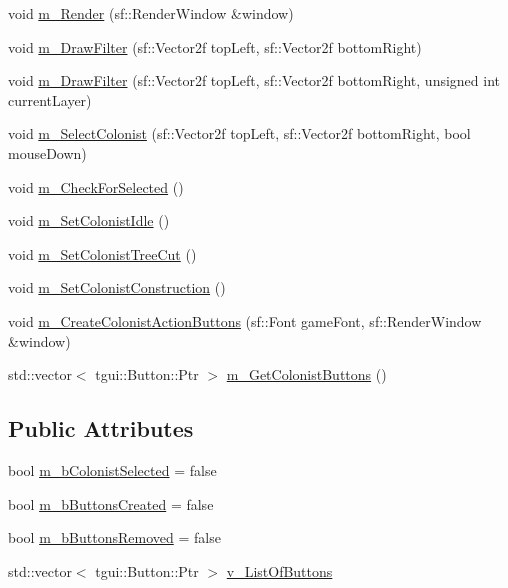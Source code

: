 \begin{DoxyCompactItemize}
void \mbox{\hyperlink{class_colonist_manager_a03bf090e3d6dc4f731daef7f91ea1f11}{m\+\_\+\+Render}} (sf\+::\+Render\+Window \&window)
\item 
void \mbox{\hyperlink{class_colonist_manager_ae7960d47970d69bc0f2f3de15321fa90}{m\+\_\+\+Draw\+Filter}} (sf\+::\+Vector2f top\+Left, sf\+::\+Vector2f bottom\+Right)
\item 
void \mbox{\hyperlink{class_colonist_manager_a1cfc018393b4410129875a3fe0be4fd4}{m\+\_\+\+Draw\+Filter}} (sf\+::\+Vector2f top\+Left, sf\+::\+Vector2f bottom\+Right, unsigned int current\+Layer)
\item 
void \mbox{\hyperlink{class_colonist_manager_adb2f8be8fad5170fb41385c6a62a0ba5}{m\+\_\+\+Select\+Colonist}} (sf\+::\+Vector2f top\+Left, sf\+::\+Vector2f bottom\+Right, bool mouse\+Down)
\item 
void \mbox{\hyperlink{class_colonist_manager_ac21585da4afdb19b5b5474c630960189}{m\+\_\+\+Check\+For\+Selected}} ()
\item 
void \mbox{\hyperlink{class_colonist_manager_a8a9cb88c826c72026575e5c2d9bec88d}{m\+\_\+\+Set\+Colonist\+Idle}} ()
\item 
void \mbox{\hyperlink{class_colonist_manager_ad494974bebe1f0af43b2721f289f7772}{m\+\_\+\+Set\+Colonist\+Tree\+Cut}} ()
\item 
void \mbox{\hyperlink{class_colonist_manager_a64d61e7131db646318691539f0460eed}{m\+\_\+\+Set\+Colonist\+Construction}} ()
\item 
void \mbox{\hyperlink{class_colonist_manager_ab3101b874a6411a4929a7238200e1599}{m\+\_\+\+Create\+Colonist\+Action\+Buttons}} (sf\+::\+Font game\+Font, sf\+::\+Render\+Window \&window)
\item 
std\+::vector$<$ tgui\+::\+Button\+::\+Ptr $>$ \mbox{\hyperlink{class_colonist_manager_abcfd2d4b02e3acc1baa932b72f84f9eb}{m\+\_\+\+Get\+Colonist\+Buttons}} ()
\end{DoxyCompactItemize}
\subsection*{Public Attributes}
\begin{DoxyCompactItemize}
\item 
bool \mbox{\hyperlink{class_colonist_manager_a0b3bc58666c4a5064db8227f3c92cf64}{m\+\_\+b\+Colonist\+Selected}} = false
\item 
bool \mbox{\hyperlink{class_colonist_manager_a62044d795d70510931bbcfb3100267be}{m\+\_\+b\+Buttons\+Created}} = false
\item 
bool \mbox{\hyperlink{class_colonist_manager_a8d9b925d50fd4cbedba3685f4471fbe2}{m\+\_\+b\+Buttons\+Removed}} = false
\item 
std\+::vector$<$ tgui\+::\+Button\+::\+Ptr $>$ \mbox{\hyperlink{class_colonist_manager_a450c58b087a8c44286bddacf36c51811}{v\+\_\+\+List\+Of\+Buttons}}
\end{DoxyCompactItemize}


